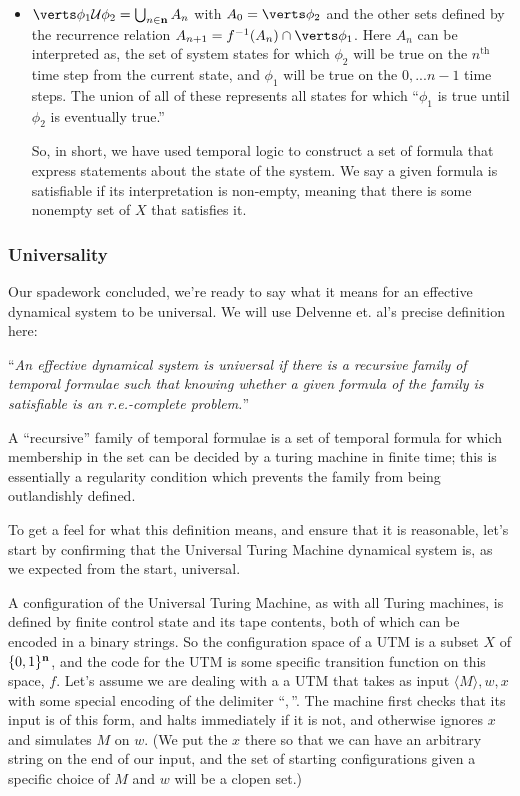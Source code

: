 \documentclass{fkpaper}
\newcommand{\ltil}{\mathcal{U}}
\begin{document}
\begin{multicols}{2}
\begin{itemize}
  \item $\abs{\phi_1 \ltil \phi_2} = \bigcup_{n \in \Nn} A_n$ with $A_0 = \abs{\phi_2}$ and the other sets defined by the recurrence relation $A_{n+1} = f^{-1}(A_n)\cap\abs{\phi_1}$. Here $A_n$ can be interpreted as, the set of system states for which $\phi_2$ will be true on the $n^{\text{th}}$ time step from the current state, and $\phi_1$ will be true on the $0,...n-1$ time steps. The union of all of these represents all states for which ``$\phi_1$ is true until $\phi_2$ is eventually true.''

    So, in short, we have used temporal logic to construct a set of formula that express statements about the state of the system. We say a given formula is satisfiable if its interpretation is non-empty, meaning that there is some nonempty set of $X$ that satisfies it.

\end{itemize}


\subsubsection*{Universality}

Our spadework concluded, we're ready to say what it means for an effective dynamical system to be universal. We will use Delvenne et. al's precise definition here:

``{\it An effective dynamical system is \emph{universal} if there is a recursive family of temporal formulae such that knowing whether a given formula of the family is satisfiable is an r.e.-complete problem.}''

A ``recursive'' family of temporal formulae is a set of temporal formula for which membership in the set can be decided by a turing machine in finite time; this is essentially a regularity condition which prevents the family from being outlandishly defined.

To get a feel for what this definition means, and ensure that it is reasonable, let's start by confirming that the Universal Turing Machine dynamical system  is, as we expected from the start, universal.

A configuration of the Universal Turing Machine, as with all Turing machines, is defined by finite control state and its tape contents, both of which can be encoded in a binary strings. So the configuration space of a UTM is a subset $X$ of $\{0,1\}^{\mathbf{n}}$, and the code for the UTM is some specific transition function on this space, $f$. Let's assume we are dealing with a a UTM that takes as input $\langle M \rangle, w, x$ with some special encoding of the delimiter ``$,$''. The machine first checks that its input is of this form, and halts immediately if it is not, and otherwise ignores $x$ and simulates $M$ on $w$. (We put the $x$ there so that we can have an arbitrary string on the end of our input, and the set of starting configurations given a specific choice of $M$ and $w$ will be a clopen set.)


\end{multicols}
\end{document}
